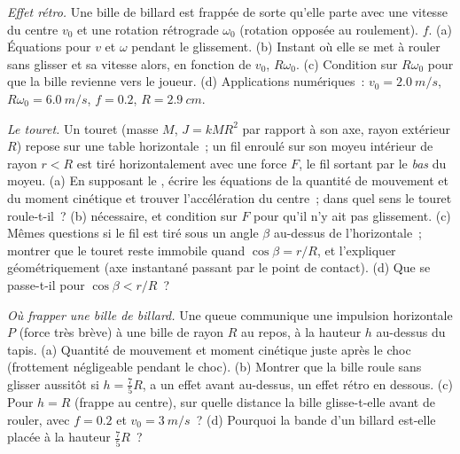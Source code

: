 \begin{exercise}[$\star\star$]\label{exo:b2:rigid-body-mechanics:9}
\emph{Effet rétro.} Une bille de billard est frappée de sorte qu'elle parte avec une
vitesse du centre $v_0$ et une rotation rétrograde $\omega_0$ (rotation opposée au
roulement).  $f$. (a) Équations pour $v$ et $\omega$
pendant le glissement. (b) Instant où elle se met à rouler sans glisser et
sa vitesse alors, en fonction de $v_0$, $R\omega_0$. (c) Condition sur
$R\omega_0$ pour que la bille revienne vers le joueur. (d) Applications numériques~:
$v_0 = \qty{2.0}{m/s}$, $R\omega_0 = \qty{6.0}{m/s}$, $f = 0.2$,
$R = \qty{2.9}{cm}$.
\end{exercise}

\begin{exercise}[$\star\star\star$]\label{exo:b2:rigid-body-mechanics:10}
\emph{Le touret.} Un touret (masse $M$,  $J = kMR^2$ par rapport à
son axe, rayon extérieur $R$) repose sur une table horizontale~; un fil enroulé
sur son moyeu intérieur de rayon $r < R$ est tiré horizontalement avec une force
$F$, le fil sortant par le \emph{bas} du moyeu. (a) En supposant le
, écrire les équations de la quantité de mouvement et du moment
cinétique et trouver l'accélération du centre~; dans quel sens le
touret roule-t-il~? (b)  nécessaire, et condition sur $F$ pour qu'il n'y
ait pas glissement. (c) Mêmes questions si le fil est tiré sous un angle
$\beta$ au-dessus de l'horizontale~; montrer que le touret reste immobile quand
$\cos\beta = r/R$, et l'expliquer géométriquement (axe instantané passant par
le point de contact). (d) Que se passe-t-il pour $\cos\beta < r/R$~?
\end{exercise}

\begin{exercise}[$\star\star\star$]\label{exo:b2:rigid-body-mechanics:11}
\emph{Où frapper une bille de billard.} Une queue communique une impulsion
horizontale $P$ (force très brève) à une bille de rayon $R$ au repos, à la
hauteur $h$ au-dessus du tapis. (a) Quantité de mouvement et moment cinétique juste après
le choc (frottement négligeable pendant le choc). (b) Montrer que la bille
roule sans glisser aussitôt si $h = \tfrac75R$, a un effet avant au-dessus,
un effet rétro en dessous. (c) Pour $h = R$ (frappe au centre), sur quelle distance la bille
glisse-t-elle avant de rouler, avec $f = 0.2$ et $v_0 = \qty{3}{m/s}$~? (d) Pourquoi
la bande d'un billard est-elle placée à la hauteur $\tfrac75R$~?
\end{exercise}

